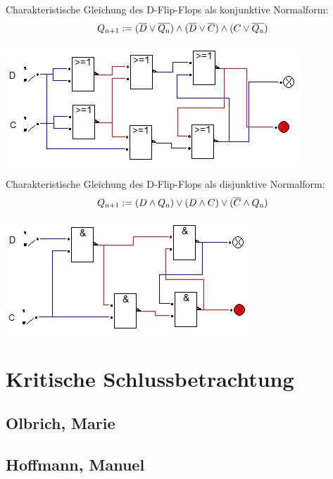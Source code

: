 \documentclass[a4paper, 11pt, fleqn, DIV=10, twoside, BCOR=10mm]{scrreprt}
\begin{document}
\begin{center}
\vspace{15mm}

Charakteristische Gleichung des D-Flip-Flops als konjunktive Normalform:
\begin{equation}
	Q\textsubscript{n+1}:=( \overline{D} \vee \overline{Q \textsubscript{n}})\wedge (\overline{D}\vee \overline{C}) \wedge (C \vee \overline{Q \textsubscript{n}})
\end{equation}

\includegraphics[width=0.5\columnwidth]{DT3Graphics/D-FF-NOR.PNG}

Charakteristische Gleichung des D-Flip-Flops als disjunktive Normalform:
\begin{equation}
	Q\textsubscript{n+1}:=( D\wedge Q \textsubscript{n} )\vee (D \wedge C) \vee (\overline{C} \wedge Q \textsubscript{n})
\end{equation}

\includegraphics[width=0.5\columnwidth]{DT3Graphics/D-FF-NAND.PNG}
\end{center}
\chapter{Kritische Schlussbetrachtung}
\section{Olbrich, Marie}
 
\section{Hoffmann, Manuel}



\end{document}
